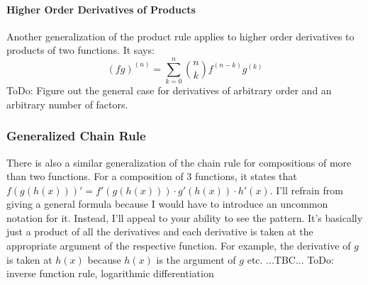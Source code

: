 
\paragraph{Higher Order Derivatives of Products}
Another generalization of the product rule applies to higher order derivatives to products of two functions. It says:
\begin{equation}
 (f g)^{(n)} = \sum_{k=0}^n \binom{n}{k}   f^{(n-k)} g^{(k)}
\end{equation}
ToDo: Figure out the general case for derivatives of arbitrary order and an arbitrary number of factors.




\subsubsection{Generalized Chain Rule}
There is also a similar generalization of the chain rule for compositions of more than two functions. For a composition of 3 functions, it states that $f(g(h(x)))' =  f'(g(h(x))) \cdot g'(h(x)) \cdot h'(x)$. I'll refrain from giving a general formula because I would have to introduce an uncommon notation for it. Instead, I'll appeal to your ability to see the pattern. It's basically just a product of all the derivatives and each derivative is taken at the appropriate argument of the respective function. For example, the derivative of $g$ is taken at $h(x)$ because $h(x)$ is the argument of $g$ etc. ...TBC... ToDo: inverse function rule, logarithmic differentiation

